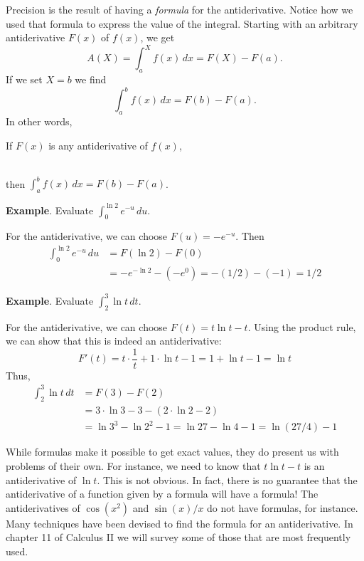 Precision is the result of having a {\em formula\/} for the
antiderivative.  Notice how we used that formula to express the value
of the integral.  Starting with an arbitrary antiderivative $F(x)$ of
$f(x)$, we get
	\[
A(X) = \int_a^X f(x) \, dx = F(X) - F(a).
\]
If we set $X = b$ we find
	\[
\int_a^b f(x) \, dx = F(b) - F(a).
\]
In other words,\label{fund th-antider}
\begin{observation}
If $F(x)$ is any antiderivative of $f(x)$,
	\rule[-6pt]{0pt}{15pt}\\
then ${\displaystyle \int_a^b f(x) \, dx = F(b) - F(a)}$.
\end{observation}



{\bf Example}. \quad Evaluate ${\displaystyle \int_0^{\ln{2}} e^{-u}
  \, du.}$




For the antiderivative, we can choose $F(u) = -e^{-u}$.  Then
\begin{align*}
\int_0^{\ln{2}} e^{-u} \, du &= F(\ln{2}) - F(0) \\
	&= -e^{-\ln{2}} - (-e^{0})
	= -(1/2) - (-1)
	= 1/2
\end{align*}



{\bf Example}. \quad Evaluate ${\displaystyle \int_2^3 \ln{t} \, dt.}$



For the antiderivative, we can choose $F(t) = t \ln{t} - t$.  Using
the product rule, we can show that this is indeed an antiderivative:
\[
F'(t) =	t \cdot \dfrac{1}{t} + 1 \cdot \ln{t} - 1
      = 1 + \ln{t} - 1 = \ln{t}
\]
Thus,
\begin{align*}
\int_2^3 \ln{t} \, dt &= F(3) - F(2) \\
		&= 3 \cdot \ln{3} - 3 - (2 \cdot \ln{2} - 2) \\
		&= \ln{3^3} - \ln{2^2} - 1
		= \ln{27} - \ln{4} - 1
		= \ln(27/4) - 1
\end{align*}

While formulas make it possible to get exact values, they do present
us with problems of their own.  For instance, we need to know that $t
\ln{t} - t$ is an antiderivative of $\ln{t}$.  This is not obvious.
In fact, there is no guarantee that the antiderivative of a function
given by a formula will have a formula!  The antiderivatives of
$\cos(x^2)$ and $\sin(x)/x$ do not have formulas, for instance.  Many
techniques have been devised to find the formula for an
antiderivative.  In chapter 11 of Calculus II we will survey some of
those that are most frequently used.



